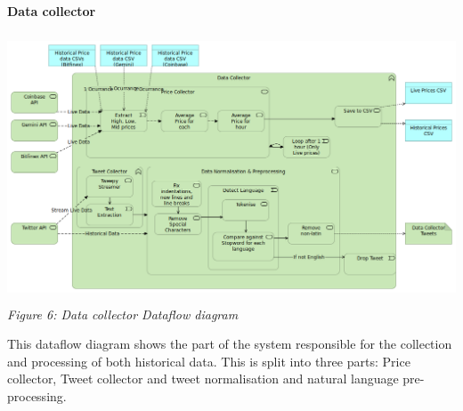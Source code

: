 \documentclass[oneside, 10pt]{article}
\begin{document}
		\textbf{Data collector}
		\begin{center}
			\includegraphics[width=15cm,height=8cm]{images/Data_Collector.png}
			\textit{Figure 6: Data collector Dataflow diagram}
		\end{center}
		This dataflow diagram shows the part of the system responsible for the collection and processing of both historical data. This is split into three parts: Price collector, Tweet collector and tweet normalisation and natural language pre-processing.
\end{document}
